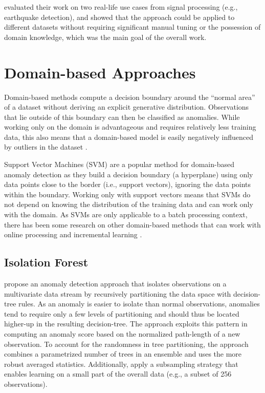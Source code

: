 \citet{kanarachos_detecting_2017} evaluated their work on two real-life use cases from signal processing (e.g., earthquake detection), and showed that the approach could be applied to different datasets without requiring significant manual tuning or the possession of domain knowledge, which was the main goal of the overall work.


\section{Domain-based Approaches}
Domain-based methods compute a decision boundary around the ``normal area'' of a dataset without deriving an explicit generative distribution. Observations that lie outside of this boundary can then be classified as anomalies. While working only on the domain is advantageous and requires relatively less training data, this also means that a domain-based model is easily negatively influenced by outliers in the dataset \citep{pimentel_review_2014}.

Support Vector Machines (SVM) are a popular method for domain-based anomaly detection as they build a decision boundary (a hyperplane) using only data points close to the border (i.e., support vectors), ignoring the data points within the boundary. Working only with support vectors means that SVMs do not depend on knowing the distribution of the training data and can work only with the domain. As SVMs are only applicable to a batch processing context, there has been some research on other domain-based methods that can work with online processing and incremental learning \citep{pimentel_review_2014}. 


\subsection{Isolation Forest \citep{liu_isolation_2008}}
\citet{liu_isolation_2008} propose an anomaly detection approach that isolates observations on a multivariate data stream by recursively partitioning the data space with decision-tree rules. As an anomaly is easier to isolate than normal observations, anomalies tend to require only a few levels of partitioning and should thus be located higher-up in the resulting decision-tree. The approach exploits this pattern in computing an anomaly score based on the normalized path-length of a new observation. To account for the randomness in tree partitioning, the approach combines a parametrized number of trees in an ensemble and uses the more robust averaged statistics. Additionally, \citet{liu_isolation_2008} apply a subsampling strategy that enables learning on a small part of the overall data (e.g., a subset of 256 observations).

